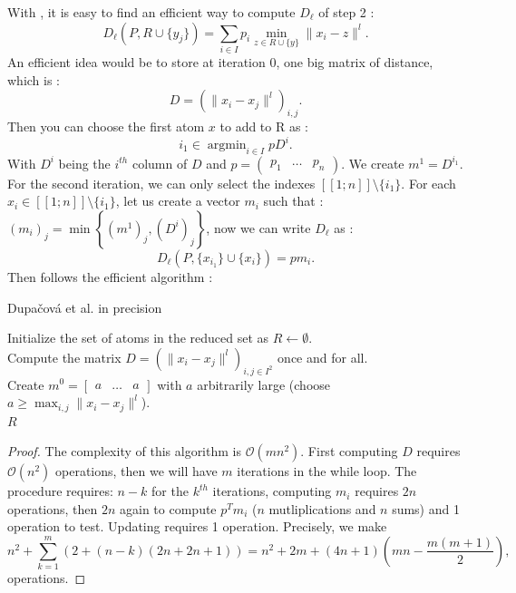\documentclass{amsart}
\newcommand{\argmin}{\mathop{\arg\min}}
\begin{document}
With , it is easy to find an efficient way to compute $D_\ell$ of step 2 : 
$$
D_\ell\left(P,R\cup \{y_j\}\right)=\sum_{i\in I}p_i\min_{z\in R\cup\{y\}}\lVert x_i-z \rVert^l.
$$
An efficient idea would be to store at iteration $0$, one big matrix of distance, which is : 
$$
D = \left(\lVert x_i-x_j\rVert ^l \right)_{i,j}.
$$
Then you can choose the first atom $x$ to add to R as :
$$
i_1 \in \argmin_{i\in I} pD^i.
$$
With $D^i$ being the $i^{th}$ column of $D$ and $p=\begin{pmatrix}
    p_1 & \hdots & p_n
\end{pmatrix}$.
We create $m^1=D^{i_1}$. For the second iteration, we can only select the indexes $[\![1;n]\!]\setminus \{i_1\}$. For each $x_i\in [\![1;n]\!]\setminus \{i_1\}$, let us create a vector $m_i$ such that : $\left(m_i\right)_j=\min\left\{\left(m^1\right)_j,\left(D^i\right)_j\right\}$, now we can write $D_\ell$ as : $$
D_\ell\left(P,\{x_{i_1}\}\cup \{x_i\}\right)=pm_i.
$$
Then follows the efficient algorithm :
\begin{algorithm}
\caption{Dupačová et al. in precision}
Initialize the set of atoms in the reduced set as $R \gets \emptyset$.\\
Compute the matrix $D = \left(\| x_i - x_j \|^l \right)_{i,j \in I^2}$ once and for all.\\
Create $m^0 = \begin{bmatrix} a & \hdots & a \end{bmatrix}$ with $a$ arbitrarily large (choose $a \geq \max_{i,j} \| x_i - x_j \|^l$).\\
\Return $R$\\
\end{algorithm}
\begin{proof}\label{complexity}
The complexity of this algorithm is $\mathcal{O}\left(mn^2\right)$. First computing $D$ requires $\mathcal{O}\left(n^2\right)$ operations, then we will have $m$ iterations in the while loop. The procedure requires: $n-k$ for the $k^{th}$ iterations, computing $m_i$ requires $2n$ operations, then $2n$ again to compute $p^Tm_i$ ($n$ mutliplications and $n$ sums) and 1 operation to test. Updating requires 1 operation.
Precisely, we make
$$
n^2+\sum_{k=1}^m\left(2+\left(n-k\right)\left(2n+2n+1\right)\right)= n^2+2m+\left(4n+1\right)\left(mn-\frac{m\left(m+1\right)}{2}\right),
$$
operations.
\end{proof}
\end{document}
